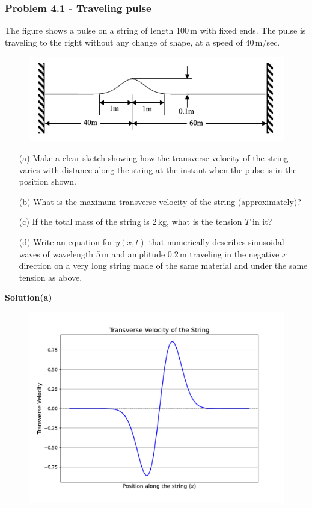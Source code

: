 \documentclass[12pt,a4paper]{article}
\begin{document}
\subsubsection*{Problem 4.1 - Traveling pulse}
The figure shows a pulse on a string of length 100\,m with fixed ends. The pulse is traveling to the right without any change of shape, at a speed of 40\,m/sec.
\begin{figure}[h]
    \centering
    \includegraphics[width=0.6\linewidth]{figs/fig_prob_4.1.png}
\end{figure}
\begin{enumerate}
    \item[(a)]Make a clear sketch showing how the transverse velocity of the string varies with distance along the string at the instant when the pulse is in the position shown.
    \item[(b)]What is the maximum transverse velocity of the string (approximately)?
    \item[(c)]If the total mass of the string is 2\,kg, what is the tension $T$ in it?
    \item[(d)]Write an equation for $y(x,t)$ that numerically describes sinusoidal waves of wavelength 5\,m and amplitude 0.2\,m traveling in the negative $x$ direction on a very long string made of the same material and under the same tension as above.
\end{enumerate}
\textbf{Solution(a)}
\begin{figure}[h!]
    \centering
    \includegraphics[width=0.879\linewidth]{figs/fig_sol_4.1a.pdf}
\end{figure}
\end{document}
